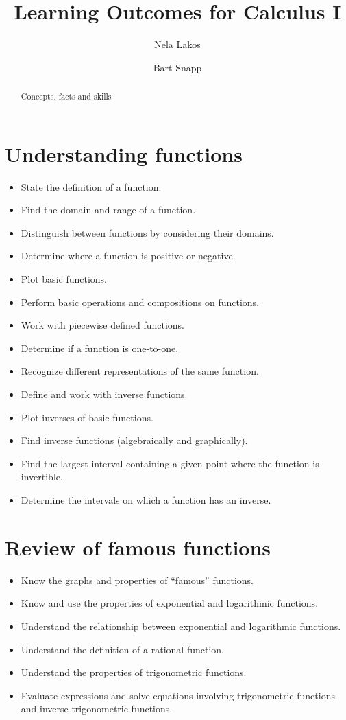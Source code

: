 \documentclass{ximera}
\author{ Nela Lakos\and Bart Snapp}
\title{Learning Outcomes for Calculus I }
\begin{document}
\begin{abstract}
Concepts, facts and skills
\end{abstract}
\maketitle
\section{Understanding functions}
\begin{itemize}
	\item State the definition of a function.
	\item Find the domain and range of a function.
	\item Distinguish between functions by considering their domains.
	\item Determine where a function is positive or negative.
	\item Plot basic functions.
        \item Perform basic operations and compositions on
          functions.
        \item Work with piecewise defined functions.
	\item Determine if a function is one-to-one.
	\item Recognize different representations of the same function.
        \item Define and work with inverse functions.
        \item Plot inverses of basic functions.
	\item Find inverse functions (algebraically and graphically).
        \item Find the largest interval containing a given point
          where the function is invertible.
	\item Determine the intervals on which a function has an inverse.

\end{itemize}

\section{Review of famous functions}


\begin{itemize}
	\item Know the graphs and properties of ``famous'' functions.
	\item Know and use the properties of exponential and logarithmic functions.
	\item Understand the relationship between exponential and logarithmic functions.
        \item Understand the definition of a rational function.
	\item Understand the properties of trigonometric functions.
	\item Evaluate expressions and solve equations involving
          trigonometric functions and inverse trigonometric functions.
\end{itemize}
\end{document}
